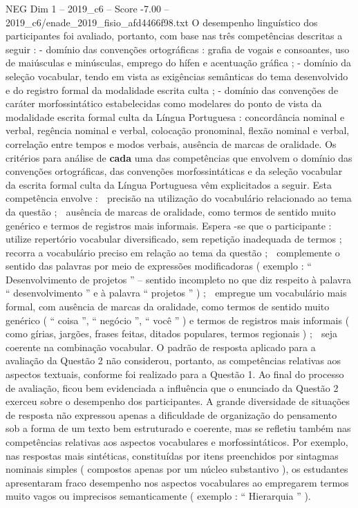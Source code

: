 \begin{textsample}{NEG Dim 1 – 2019\_c6 – Score -7.00 – 2019\_c6/enade\_2019\_fisio\_afd4466f98.txt}
O desempenho linguístico dos participantes foi avaliado, portanto, com base nas três competências descritas a seguir : - domínio das convenções ortográficas : grafia de vogais e consoantes, uso de maiúsculas e minúsculas, emprego do hífen e acentuação gráfica ; - domínio da seleção vocabular, tendo em vista as exigências semânticas do tema desenvolvido e do registro formal da modalidade escrita culta ; - domínio das convenções de caráter morfossintático estabelecidas como modelares do ponto de vista da modalidade escrita formal culta da Língua Portuguesa : concordância nominal e verbal, regência nominal e verbal, colocação pronominal, flexão nominal e verbal, correlação entre tempos e modos verbais, ausência de marcas de oralidade.
Os critérios para análise de \textbf{cada} uma das competências que envolvem o domínio das convenções ortográficas, das convenções morfossintáticas e da seleção vocabular da escrita formal culta da Língua Portuguesa vêm explicitados a seguir.
Esta competência envolve :  precisão na utilização do vocabulário relacionado ao tema da questão ;  ausência de marcas de oralidade, como termos de sentido muito genérico e termos de registros mais informais.
Espera -se que o participante :  utilize repertório vocabular diversificado, sem repetição inadequada de termos ;  recorra a vocabulário preciso em relação ao tema da questão ;  complemente o sentido das palavras por meio de expressões modificadoras ( exemplo : “ Desenvolvimento de projetos ” – sentido incompleto no que diz respeito à palavra “ desenvolvimento ” e à palavra “ projetos ” ) ;  empregue um vocabulário mais formal, com ausência de marcas da oralidade, como termos de sentido muito genérico ( “ coisa ”, “ negócio ”, “ você ” ) e termos de registros mais informais ( como gírias, jargões, frases feitas, ditados populares, termos regionais ) ;  seja coerente na combinação vocabular.
O padrão de resposta aplicado para a avaliação da Questão 2 não considerou, portanto, as competências relativas aos aspectos textuais, conforme foi realizado para a Questão 1.
Ao final do processo de avaliação, ficou bem evidenciada a influência que o enunciado da Questão 2 exerceu sobre o desempenho dos participantes.
A grande diversidade de situações de resposta não expressou apenas a dificuldade de organização do pensamento sob a forma de um texto bem estruturado e coerente, mas se refletiu também nas competências relativas aos aspectos vocabulares e morfossintáticos.
Por exemplo, nas respostas mais sintéticas, constituídas por itens preenchidos por sintagmas nominais simples ( compostos apenas por um núcleo substantivo ), os estudantes apresentaram fraco desempenho nos aspectos vocabulares ao empregarem termos muito vagos ou imprecisos semanticamente ( exemplo : “ Hierarquia ” ).

\end{textsample}
